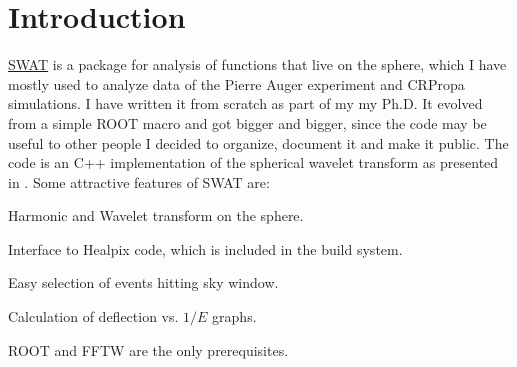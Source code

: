 \documentclass[12pt]{article}
\begin{document}
  \vfill


\newpage
\tableofcontents

\newpage
\section{Introduction} \label{ch::Introduction}

\href{http://www.ifi.unicamp.br/~mzimbres}{SWAT} is a package for analysis of
functions that live on the sphere, which I have mostly used to analyze data of
the Pierre Auger experiment and CRPropa simulations. I have written it from
scratch as part of my my Ph.D. It evolved from a simple ROOT macro and
got bigger and bigger, since the code may be useful to other people I decided
to organize, document it and make it public. The code is an C++ implementation
of the spherical wavelet transform as presented in \cite{wiaux}. Some
attractive features of SWAT are:

\begin{list}{}{}
\item Harmonic and Wavelet transform on the sphere.
\item Interface to Healpix code, which is included in the build system.
\item Easy selection of events hitting sky window. 
\item Calculation of deflection vs. $1/E$ graphs.
\item ROOT and FFTW are the only prerequisites.
\end{list}
\end{document}
